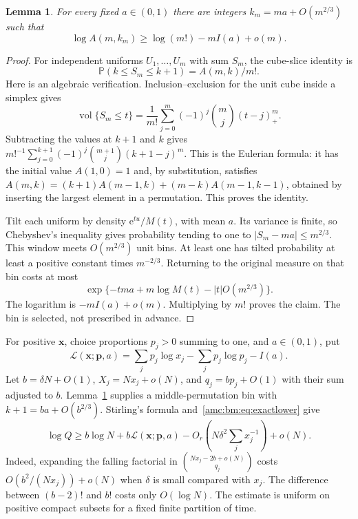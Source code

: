 \documentclass[11pt,letterpaper]{article}
\newtheorem{lemma}[theorem]{Lemma}
\theoremstyle{remark}\newtheorem{remark}[theorem]{Remark}
\newcommand{\ee}{\mathrm e}
\newcommand{\cL}{\mathcal L}
\newcommand{\bx}{\boldsymbol x}
\newcommand{\bp}{\boldsymbol p}
\begin{document}
\begin{lemma}\label{amc:bm:lem:eulerian}
For every fixed $a\in(0,1)$ there are integers $k_m=ma+O(m^{2/3})$ such that
\begin{equation}\label{amc:bm:eq:eulerianentropy}
 \log A(m,k_m)\ge\log(m!)-mI(a)+o(m).
\end{equation}
\end{lemma}
\begin{proof}
For independent uniforms $U_1,\ldots,U_m$ with sum $S_m$, the cube-slice identity is
\[
 \mathbb P(k\le S_m\le k+1)=A(m,k)/m!.
\]
Here is an algebraic verification. Inclusion--exclusion for the unit cube inside a simplex gives
\[
 \operatorname{vol}\{S_m\le t\}
 =\frac1{m!}\sum_{j=0}^m(-1)^j\binom mj(t-j)_+^m.
\]
Subtracting the values at $k+1$ and $k$ gives $m!^{-1}\sum_{j=0}^{k+1}(-1)^j\binom{m+1}j(k+1-j)^m$. This is the Eulerian formula: it has the initial value $A(1,0)=1$ and, by substitution, satisfies
$A(m,k)=(k+1)A(m-1,k)+(m-k)A(m-1,k-1)$, obtained by inserting the largest element in a permutation. This proves the identity.

Tilt each uniform by density $\ee^{tu}/M(t)$, with mean $a$. Its variance is finite, so Chebyshev's inequality gives probability tending to one to $|S_m-ma|\le m^{2/3}$. This window meets $O(m^{2/3})$ unit bins. At least one has tilted probability at least a positive constant times $m^{-2/3}$. Returning to the original measure on that bin costs at most
\[
 \exp\{-tma+m\log M(t)-|t|O(m^{2/3})\}.
\]
The logarithm is $-mI(a)+o(m)$. Multiplying by $m!$ proves the claim. The bin is selected, not prescribed in advance.
\end{proof}

For positive $\bx$, choice proportions $p_j>0$ summing to one, and $a\in(0,1)$, put
\begin{equation}\label{amc:bm:eq:entropy}
 \cL(\bx;\bp,a)=\sum_jp_j\log x_j-\sum_jp_j\log p_j-I(a).
\end{equation}
Let $b=\delta N+O(1)$, $X_j=Nx_j+o(N)$, and $q_j=bp_j+O(1)$ with their sum adjusted to $b$. Lemma~\ref{amc:bm:lem:eulerian} supplies a middle-permutation bin with $k+1=ba+O(b^{2/3})$. Stirling's formula and~\eqref{amc:bm:eq:exactlower} give
\begin{equation}\label{amc:bm:eq:blockentropy}
 \log Q\ge b\log N+b\cL(\bx;\bp,a)
   -O_r\left(N\delta^2\sum_jx_j^{-1}\right)+o(N).
\end{equation}
Indeed, expanding the falling factorial in $\binom{Nx_j-2b+o(N)}{q_j}$ costs $O(b^2/(Nx_j))+o(N)$ when $\delta$ is small compared with $x_j$. The difference between $(b-2)!$ and $b!$ costs only $O(\log N)$. The estimate is uniform on positive compact subsets for a fixed finite partition of time.
\end{document}
